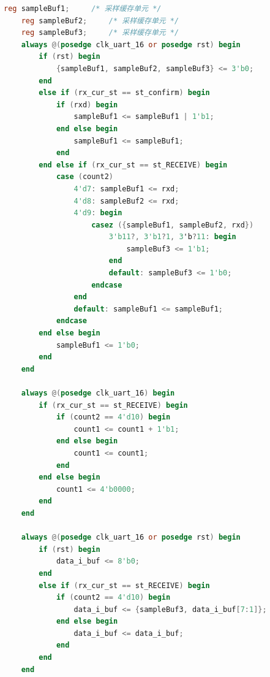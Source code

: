 \documentclass{article}
\begin{document}
\begin{lstlisting}[language=Verilog, caption={16倍过采样UART模块}]
    reg sampleBuf1;     /* 采样缓存单元 */
    reg sampleBuf2;     /* 采样缓存单元 */
    reg sampleBuf3;     /* 采样缓存单元 */
    always @(posedge clk_uart_16 or posedge rst) begin
        if (rst) begin
            {sampleBuf1, sampleBuf2, sampleBuf3} <= 3'b0;
        end
        else if (rx_cur_st == st_confirm) begin
            if (rxd) begin
                sampleBuf1 <= sampleBuf1 | 1'b1;
            end else begin
                sampleBuf1 <= sampleBuf1;
            end
        end else if (rx_cur_st == st_RECEIVE) begin
            case (count2)
                4'd7: sampleBuf1 <= rxd;
                4'd8: sampleBuf2 <= rxd;
                4'd9: begin
                    casez ({sampleBuf1, sampleBuf2, rxd})
                        3'b11?, 3'b1?1, 3'b?11: begin
                            sampleBuf3 <= 1'b1;
                        end
                        default: sampleBuf3 <= 1'b0;
                    endcase
                end
                default: sampleBuf1 <= sampleBuf1;
            endcase
        end else begin
            sampleBuf1 <= 1'b0;
        end
    end

    always @(posedge clk_uart_16) begin
        if (rx_cur_st == st_RECEIVE) begin
            if (count2 == 4'd10) begin
                count1 <= count1 + 1'b1;
            end else begin
                count1 <= count1;
            end
        end else begin
            count1 <= 4'b0000;
        end
    end

    always @(posedge clk_uart_16 or posedge rst) begin
        if (rst) begin
            data_i_buf <= 8'b0;
        end
        else if (rx_cur_st == st_RECEIVE) begin
            if (count2 == 4'd10) begin
                data_i_buf <= {sampleBuf3, data_i_buf[7:1]};
            end else begin
                data_i_buf <= data_i_buf;
            end
        end
    end


\end{lstlisting}
\end{document}
